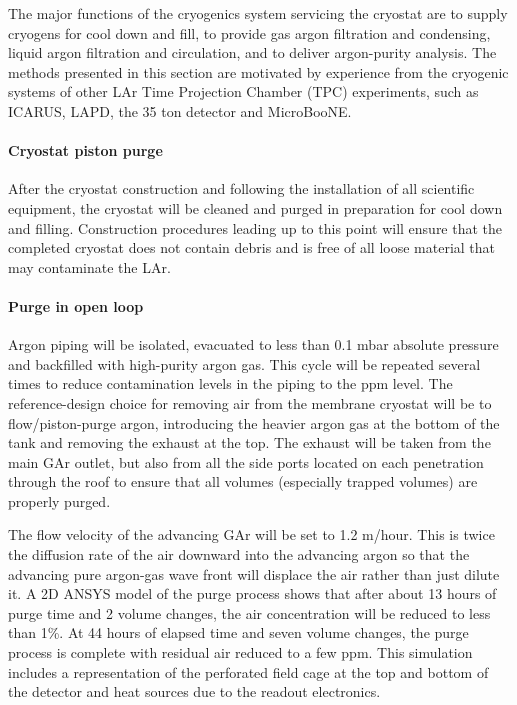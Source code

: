 The major functions of the cryogenics system servicing the cryostat are to supply cryogens for cool down and fill, to provide gas argon filtration and condensing, liquid argon filtration and circulation, and to deliver argon-purity analysis. The methods presented in this section are motivated by experience from the cryogenic systems of other LAr Time Projection Chamber (TPC) experiments, such as ICARUS, LAPD, the 35 ton detector and MicroBooNE.

\paragraph{Cryostat piston purge}
%
After the cryostat construction and following the installation of all scientific equipment, the cryostat will be cleaned and purged in preparation for cool down and filling. Construction procedures leading up to this point will ensure that the completed cryostat does not contain debris and is free of all loose material that may contaminate the LAr.

\paragraph{Purge in open loop}
%
Argon piping will be isolated, evacuated to less than 0.1 mbar  absolute pressure and backfilled with high-purity argon gas. This cycle will be repeated several times to reduce contamination levels in the piping to the ppm level. The reference-design choice for removing air from the membrane cryostat will be to flow/piston-purge argon, introducing the heavier argon gas at the bottom of the tank and removing the exhaust at the top. The exhaust will be taken from the main GAr outlet, but also from all the side ports located on each penetration through the roof to ensure that all volumes (especially trapped volumes) are properly purged.

The flow velocity of the advancing GAr will be set to 1.2 m/hour. This is twice the diffusion rate of the air downward into the advancing argon so that the advancing pure argon-gas wave front will displace the air rather than just dilute it. A 2D ANSYS model of the purge process shows that after about 13 hours of purge time and 2 volume changes, the air concentration will be reduced to less than 1\%. At 44 hours of elapsed time and seven volume changes, the purge process is complete with residual air reduced to a few ppm. This simulation includes a representation of the perforated field cage at the top and bottom of the detector and heat sources due to the readout electronics. %

